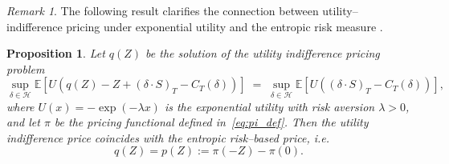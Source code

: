 \documentclass[12pt,a4paper]{article}
\theoremstyle{definition}
\theoremstyle{plain}
\newtheorem{proposition}{Proposition}[section]
\theoremstyle{remark}
\newtheorem{remark}{Remark}[section]
\theoremstyle{plain}
\begin{document}
\begin{remark}
\label{rem:link_entropic}
The following result clarifies the connection between utility--indifference pricing under exponential utility and the entropic risk measure \cite{Buehler2019DeepHedging}.
\end{remark}

\begin{proposition}
\label{prop:utility_indifference_equals_entropic}
Let $q(Z)$ be the solution of the utility indifference pricing problem
\[
    \sup_{\delta\in\mathcal H}
        \mathbb E\!\left[ U\!\left(q(Z) - Z + (\delta\cdot S)_T - C_T(\delta)\right) \right]
    \;=\;
    \sup_{\delta\in\mathcal H}
        \mathbb E\!\left[ U\!\left((\delta\cdot S)_T - C_T(\delta)\right) \right],
\]
where $U(x)=-\exp(-\lambda x)$ is the exponential utility with risk aversion $\lambda>0$, and let
$\pi$ be the pricing functional defined in~\eqref{eq:pi_def}.
Then the utility indifference price coincides with the entropic risk--based price, i.e.
\[
    q(Z) = p(Z) := \pi(-Z)-\pi(0).
\]
\end{proposition}
\end{document}
